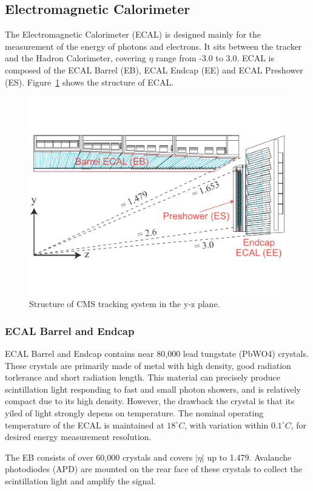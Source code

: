 \subsection{Electromagnetic Calorimeter} 
The Electromagnetic Calorimeter (ECAL)\cite{lhc_ecaldesign} is designed mainly for the measurement of the energy of photons and electrons. It sits between the tracker and the Hadron Calorimeter, covering $\eta$ range from -3.0 to 3.0. ECAL is composed of the ECAL Barrel (EB), ECAL Endcap (EE) and ECAL Preshower (ES). Figure~\ref{fig:lhc_ecal} shows the structure of ECAL.
\begin{figure}[htbp]
\begin{center}
\includegraphics[width=0.7\linewidth]{figures/lhc_ecal.pdf}
\caption{Structure of CMS tracking system in the y-z plane.}
\label{fig:lhc_ecal}
\end{center}
\end{figure}

\subsubsection{ECAL Barrel and Endcap}
ECAL Barrel and Endcap contains near 80,000 lead tungstate (PbWO4) crystals. These crystals are primarily made of metal with high density, good radiation torlerance and short radiation length. This material can precisely produce scintillation light responding to fast and small photon showers, and is relatively compact due to its high density. However, the drawback the crystal is that its yiled of light strongly depens on temperature. The nominal operating temperature of the ECAL is maintained at $18^{\circ}C$, with variation within $0.1^{\circ}C$, for desired energy measurement resolution. 

\vspace{0.3cm}
The EB consists of over 60,000 crystals and covers $|\eta|$ up to 1.479. Avalanche photodiodes (APD) are mounted on the rear face of these crystals to collect the scintillation light and amplify the signal. 

